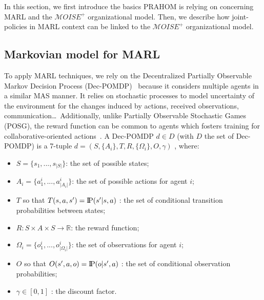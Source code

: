 \documentclass[doubleblind]{ecai}
\newcommand{\probP}{\text{I\kern-0.15em P}}
\begin{document}




In this section, we first introduce the basics PRAHOM is relying on concerning MARL and the $\mathcal{M}OISE^{+}$ organizational model. Then, we  describe how joint-policies in MARL context can be linked to the $\mathcal{M}OISE^{+}$ organizational model.

\subsection{Markovian model for MARL}

To apply MARL techniques, we rely on the Decentralized Partially Observable Markov Decision Process (Dec-POMDP)~\citep{Oliehoek2016} because it considers multiple agents in a similar MAS manner. It relies on stochastic processes to model uncertainty of the environment for the changes induced by actions, received observations, communication\dots \ Additionally, unlike Partially Observable Stochastic Games (POSG), the reward function can be common to agents which fosters training for collaborative-oriented actions~\citep{Beynier2013}.
A Dec-POMDP $d \in D$ (with $D$ the set of Dec-POMDP) is a 7-tuple $d = (S,\{A_i\},T,R,\{\Omega_i\},O,\gamma)$ , where:
\begin{itemize}
    \item $S = \{s_1,...,s_{|S|}\}$: the set of possible states;
    \item $A_{i} = \{a_{1}^{i},...,a_{|A_{i}|}^{i}\}$: the set of possible actions for agent $i$;
    \item $T$ so that $T(s,a,s') = \probP{(s'|s,a)}$ : the set of conditional transition probabilities between states;
    \item $R: S \times A \times S \rightarrow \mathbb{R}$: the reward function;
    \item $\Omega_{i} = \{o_{1}^{i},...,o_{|\Omega_{i}|}^{i}\}$: the set of observations for agent $i$;
    \item $O$ so that $O(s',a,o) = \probP{(o|s',a)}$ : the set of conditional observation probabilities;
    \item $\gamma \in [0,1]$ : the discount factor.
\end{itemize}
\end{document}
